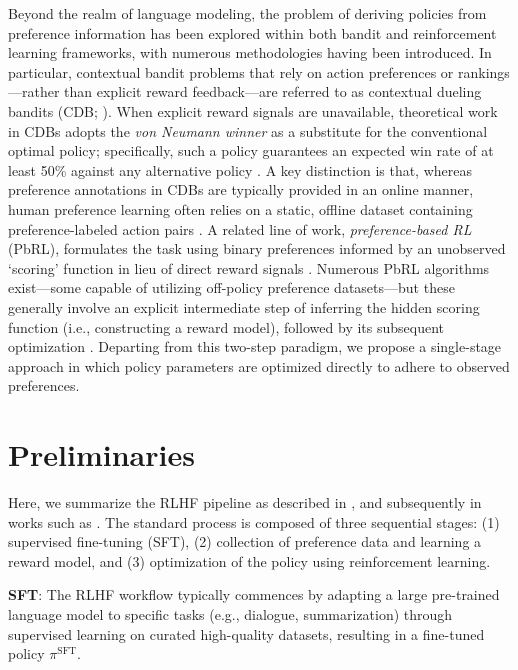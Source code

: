 Beyond the realm of language modeling, the problem of deriving policies from preference information has been explored within both bandit and reinforcement learning frameworks, with numerous methodologies having been introduced. In particular, contextual bandit problems that rely on action preferences or rankings—rather than explicit reward feedback—are referred to as contextual dueling bandits (CDB; \cite{yue2012karmed,dudik2015contextual}). When explicit reward signals are unavailable, theoretical work in CDBs adopts the \textit{von Neumann winner} as a substitute for the conventional optimal policy; specifically, such a policy guarantees an expected win rate of at least 50\% against any alternative policy \citep{dudik2015contextual}. A key distinction is that, whereas preference annotations in CDBs are typically provided in an online manner, human preference learning often relies on a static, offline dataset containing preference-labeled action pairs \citep{yan2022human}. A related line of work, \textit{preference-based RL} (PbRL), formulates the task using binary preferences informed by an unobserved ‘scoring’ function in lieu of direct reward signals \citep{BusaFekete2014,ruiz2023dueling}. Numerous PbRL algorithms exist—some capable of utilizing off-policy preference datasets—but these generally involve an explicit intermediate step of inferring the hidden scoring function (i.e., constructing a reward model), followed by its subsequent optimization \citep{jain2013learning,BusaFekete2014,christiano2017deep,sadigh2017active,kupcsik2018learning}. Departing from this two-step paradigm, we propose a single-stage approach in which policy parameters are optimized directly to adhere to observed preferences.

\section{Preliminaries}\label{section:prelims}

Here, we summarize the RLHF pipeline as described in \citeauthor{ziegler2020finetuning}, and subsequently in works such as \citep{stiennon2022learning, bai2022training, ouyang2022training}. The standard process is composed of three sequential stages: (1) supervised fine-tuning (SFT), (2) collection of preference data and learning a reward model, and (3) optimization of the policy using reinforcement learning.

\textbf{SFT}: The RLHF workflow typically commences by adapting a large pre-trained language model to specific tasks (e.g., dialogue, summarization) through supervised learning on curated high-quality datasets, resulting in a fine-tuned policy $\pi^\text{SFT}$.

